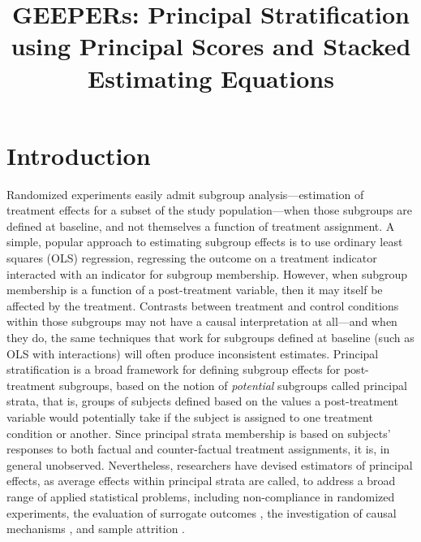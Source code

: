 \documentclass[11pt]{article} %
\title{GEEPERs: Principal Stratification using Principal Scores and Stacked Estimating Equations}
\begin{document}
\maketitle

\section{Introduction}

Randomized experiments easily admit subgroup analysis---estimation of treatment effects for a subset of the study population---when those subgroups are defined at baseline, and not themselves a function of treatment assignment.
A simple, popular approach to estimating subgroup effects is to use ordinary least squares (OLS) regression, regressing the outcome on a treatment indicator interacted with an indicator for subgroup membership.
However, when subgroup membership is a function of a post-treatment variable, then it may itself be affected by the treatment.
Contrasts between treatment and control conditions within those subgroups may not have a causal interpretation at all---and when they do, the same techniques that work for subgroups defined at baseline (such as OLS with interactions) will often produce inconsistent estimates.
Principal stratification \citep{frangakis} is a broad framework for defining subgroup effects for post-treatment subgroups, based on the notion of \emph{potential} subgroups called principal strata, that is, groups of subjects defined based on the values a post-treatment variable would potentially take if the subject is assigned to one treatment condition or another.
Since principal strata membership is based on subjects' responses to both factual and counter-factual treatment assignments, it is, in general unobserved.
Nevertheless, researchers have devised estimators of principal effects, as average effects within principal strata are called, to address a broad range of applied statistical problems, including non-compliance in randomized experiments, the evaluation of surrogate outcomes \citep{li2010bayesian}, the investigation of causal mechanisms \citep{lidsayPage}, and sample attrition \citep{zhangRubin, ding2011}.
\end{document}
